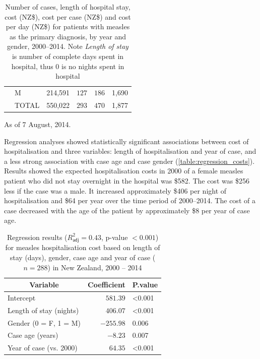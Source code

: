 \documentclass{article}
\begin{document}
\begin{table}
\begin{center}
\begin{tabular}{lllrrl}
&     M&214,591&$127$&$186$&1,690\tabularnewline
&TOTAL&550,022&$293$&$470$&1,877\tabularnewline
\hline
\end{tabular}\end{center}\caption{Number of cases, length of hospital stay, cost (NZ\$), cost per case (NZ\$) and cost per day (NZ\$) for patients with measles as the primary diagnosis, by year and gender, 2000--2014. Note \textit{Length of stay} is number of complete days spent in hospital, thus 0 is no nights spent in hospital}
\label{table:cases}
 \centering
 \begin{tablenotes}
      \small
      \item As of 7 August, 2014.
    \end{tablenotes}
\end{table}

Regression analyses showed statistically significant associations between cost of hospitalisation and three variables: length of hospitalisation and year of case, and a less strong association with case age and case gender (\autoref{table:regression_costs}). Results showed the expected hospitalisation costs in 2000 of a female measles patient who did not stay overnight in the hospital was \$582.  The cost was \$256 less if the case was a male. It increased approximately \$406 per night of hospitalisation and \$64 per year over the time period of 2000--2014. The cost of a case decreased with the age of the patient by approximately \$8 per year of case age.

\begin{table}
\begin{center}
\begin{tabular}{lrl}
\hline\hline
\multicolumn{1}{c}{Variable}&\multicolumn{1}{c}{Coefficient}&\multicolumn{1}{c}{P.value}\tabularnewline
\hline
Intercept&$ 581.39$&\textless 0.001\tabularnewline
Length of stay (nights)&$ 406.07$&\textless 0.001\tabularnewline
Gender (0 = F, 1 = M)&$-255.98$&0.006\tabularnewline
Case age (years)&$  -8.23$&0.007\tabularnewline
Year of case (vs. 2000)&$  64.35$&\textless 0.001\tabularnewline
\hline
\end{tabular}\end{center}\caption{Regression results ($R^{2}_\textsf{adj} = 0.43$, p-value $<0.001$) for measles hospitalisation cost based on length of stay (days), gender, case age and year of case ($n=288$) in New Zealand, 2000 -- 2014}
\label{table:regression_costs}
\end{table}
\end{document}
